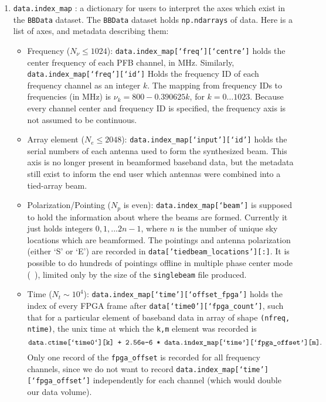 \begin{enumerate}
    \item \texttt{data.index\_map} : a dictionary for users to interpret the axes which exist in the \texttt{BBData} dataset. The \texttt{BBData} dataset holds \texttt{np.ndarrays} of data. Here is a list of axes, and metadata describing them:
    \begin{itemize}
        \item Frequency ($N_{\nu} \leq 1024$): \texttt{data.index\_map[`freq'][`centre']} holds the center frequency of each PFB channel, in MHz. Similarly, \texttt{data.index\_map[`freq'][`id']} Holds the frequency ID of each frequency channel as an integer $k$. The mapping from frequency IDs to frequencies (in MHz) is $\nu_k = 800 - 0.390625k$, for $k = 0\ldots 1023$. Because every channel center and frequency ID is specified, the frequency axis is not assumed to be continuous. 
        \item Array element ($N_e \leq 2048$): \texttt{data.index\_map[`input'][`id']} holds the serial numbers of each antenna used to form the synthesized beam. This axis is no longer present in beamformed baseband data, but the metadata still exist to inform the end user which antennas were combined into a tied-array beam.  
        \item Polarization/Pointing ($N_p$ is even): \texttt{data.index\_map[`beam']} is supposed to hold the information about where the beams are formed. Currently it just holds integers $0,1,...2n-1$, where $n$ is the number of unique sky locations which are beamformed. The pointings and antenna polarization (either `S' or `E') are recorded in \texttt{data['tiedbeam\_locations'][:]}. It is possible to do hundreds of pointings offline in multiple phase center mode (~\citep{leung2021synoptic}), limited only by the size of the \texttt{singlebeam} file produced.
        \item Time ($N_t \sim 10^4$): \texttt{data.index\_map[`time'][`offset\_fpga']} holds the index of every FPGA frame after \texttt{data[`time0'][`fpga\_count']}, such that for a particular element of baseband data in array of shape \texttt{(nfreq, ntime)}, the unix time at which the \texttt{k,m} element was recorded is 
        $$\texttt{data.ctime[`time0`][k] + 2.56e-6 * \texttt{data.index\_map[`time'][`fpga\_offset'][m]}}.$$ 
        Only one record of the \texttt{fpga\_offset} is recorded for all frequency channels, since we do not want to record \texttt{data.index\_map[`time'][`fpga\_offset']} independently for each channel (which would double our data volume). %
        \end{itemize}
    

\end{enumerate}

